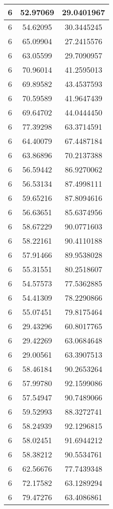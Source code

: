 \documentclass[
]{book}
\begin{document}
\begin{tabular}{c|c|c}
\hline
6 & 52.97069 & 29.0401967\\
\hline
6 & 54.62095 & 30.3445245\\
\hline
6 & 65.09904 & 27.2415576\\
\hline
6 & 63.05599 & 29.7090957\\
\hline
6 & 70.96014 & 41.2595013\\
\hline
6 & 69.89582 & 43.4537593\\
\hline
6 & 70.59589 & 41.9647439\\
\hline
6 & 69.64702 & 44.0444450\\
\hline
6 & 77.39298 & 63.3714591\\
\hline
6 & 64.40079 & 67.4487184\\
\hline
6 & 63.86896 & 70.2137388\\
\hline
6 & 56.59442 & 86.9270062\\
\hline
6 & 56.53134 & 87.4998111\\
\hline
6 & 59.65216 & 87.8094616\\
\hline
6 & 56.63651 & 85.6374956\\
\hline
6 & 58.67229 & 90.0771603\\
\hline
6 & 58.22161 & 90.4110188\\
\hline
6 & 57.91466 & 89.9538028\\
\hline
6 & 55.31551 & 80.2518607\\
\hline
6 & 54.57573 & 77.5362885\\
\hline
6 & 54.41309 & 78.2290866\\
\hline
6 & 55.07451 & 79.8175464\\
\hline
6 & 29.43296 & 60.8017765\\
\hline
6 & 29.42269 & 63.0684648\\
\hline
6 & 29.00561 & 63.3907513\\
\hline
6 & 58.46184 & 90.2653264\\
\hline
6 & 57.99780 & 92.1599086\\
\hline
6 & 57.54947 & 90.7489066\\
\hline
6 & 59.52993 & 88.3272741\\
\hline
6 & 58.24939 & 92.1296815\\
\hline
6 & 58.02451 & 91.6944212\\
\hline
6 & 58.38212 & 90.5534761\\
\hline
6 & 62.56676 & 77.7439348\\
\hline
6 & 72.17582 & 63.1289294\\
\hline
6 & 79.47276 & 63.4086861\\

\end{tabular}
\end{document}
